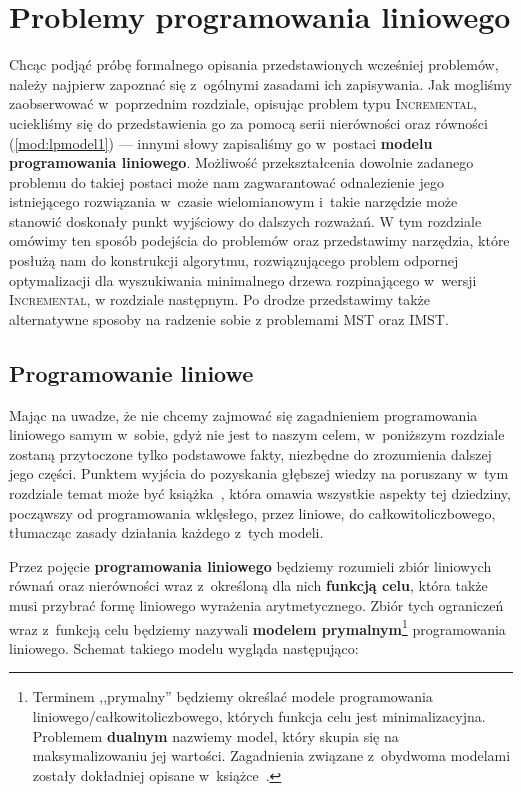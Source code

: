 \chapter{Problemy programowania liniowego}\label{ch:linearprog}
\thispagestyle{chapterBeginStyle}





Chcąc podjąć próbę formalnego opisania przedstawionych wcześniej problemów, należy najpierw zapoznać się z~ogólnymi zasadami ich zapisywania.
Jak mogliśmy zaobserwować w~poprzednim rozdziale, opisując problem typu \textsc{Incremental}, uciekliśmy się do przedstawienia go za pomocą serii nierówności oraz równości (\ref{mod:lpmodel1}) --- innymi słowy zapisaliśmy go w~postaci \textbf{modelu programowania liniowego}.
Możliwość przekształcenia dowolnie zadanego problemu do takiej postaci może nam zagwarantować odnalezienie jego istniejącego rozwiązania w~czasie wielomianowym i~takie narzędzie może stanowić doskonały punkt wyjściowy do dalszych rozważań.
W tym rozdziale omówimy ten sposób podejścia do problemów oraz przedstawimy narzędzia, które posłużą nam do konstrukcji algorytmu, rozwiązującego problem odpornej optymalizacji dla wyszukiwania minimalnego drzewa rozpinającego w~wersji \textsc{Incremental}, w rozdziale następnym.
Po drodze przedstawimy także alternatywne sposoby na radzenie sobie z problemami \textsc{MST} oraz \textsc{IMST}.




\section{Programowanie liniowe}




Mając na uwadze, że nie chcemy zajmować się zagadnieniem programowania liniowego samym w~sobie, gdyż nie jest to naszym celem, w~poniższym rozdziale zostaną przytoczone tylko podstawowe fakty, niezbędne do zrozumienia dalszej jego części.
Punktem wyjścia do pozyskania głębszej wiedzy na poruszany w~tym rozdziale temat może być książka~\cite{Papadimitriou:1982:COA:31027}, która omawia wszystkie aspekty tej dziedziny, począwszy od programowania wklęsłego, przez liniowe, do całkowitoliczbowego, tłumacząc zasady działania każdego z~tych modeli.

Przez pojęcie \textbf{programowania liniowego} będziemy rozumieli zbiór liniowych równań oraz nierówności wraz z~określoną dla nich \textbf{funkcją celu}, która także musi przybrać formę liniowego wyrażenia arytmetycznego.
Zbiór tych ograniczeń wraz z~funkcją celu będziemy nazywali \textbf{modelem prymalnym}\footnote{
	Terminem ,,prymalny'' będziemy określać modele programowania liniowego/całkowitoliczbowego, których funkcja celu jest minimalizacyjna.
	Problemem \textbf{dualnym} nazwiemy model, który skupia się na maksymalizowaniu jej wartości.
	Zagadnienia związane z~obydwoma modelami zostały dokładniej opisane w~książce~\cite[$67$--$73$]{Papadimitriou:1982:COA:31027}.
} programowania liniowego.
Schemat takiego modelu wygląda następująco:

